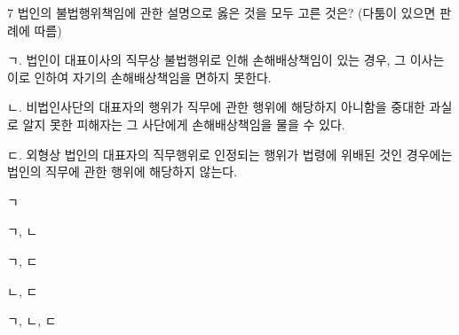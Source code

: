 \begin{question}{7}
법인의 불법행위책임에 관한 설명으로 옳은 것을 모두 고른 것은? (다툼이 있으면 판례에 따름)
\begin{framedtext}
ㄱ. 법인이 대표이사의 직무상 불법행위로 인해 손해배상책임이 있는 경우, 그 이사는 이로 인하여 자기의 손해배상책임을 면하지 못한다. \par
ㄴ. 비법인사단의 대표자의 행위가 직무에 관한 행위에 해당하지 아니함을 중대한 과실로 알지 못한 피해자는 그 사단에게 손해배상책임을 물을 수 있다. \par
ㄷ. 외형상 법인의 대표자의 직무행위로 인정되는 행위가 법령에 위배된 것인 경우에는 법인의 직무에 관한 행위에 해당하지 않는다.
\end{framedtext}
\begin{choices}
  \item ㄱ
  \item ㄱ, ㄴ
  \item ㄱ, ㄷ
  \item ㄴ, ㄷ
  \item ㄱ, ㄴ, ㄷ
\end{choices}
\end{question}
